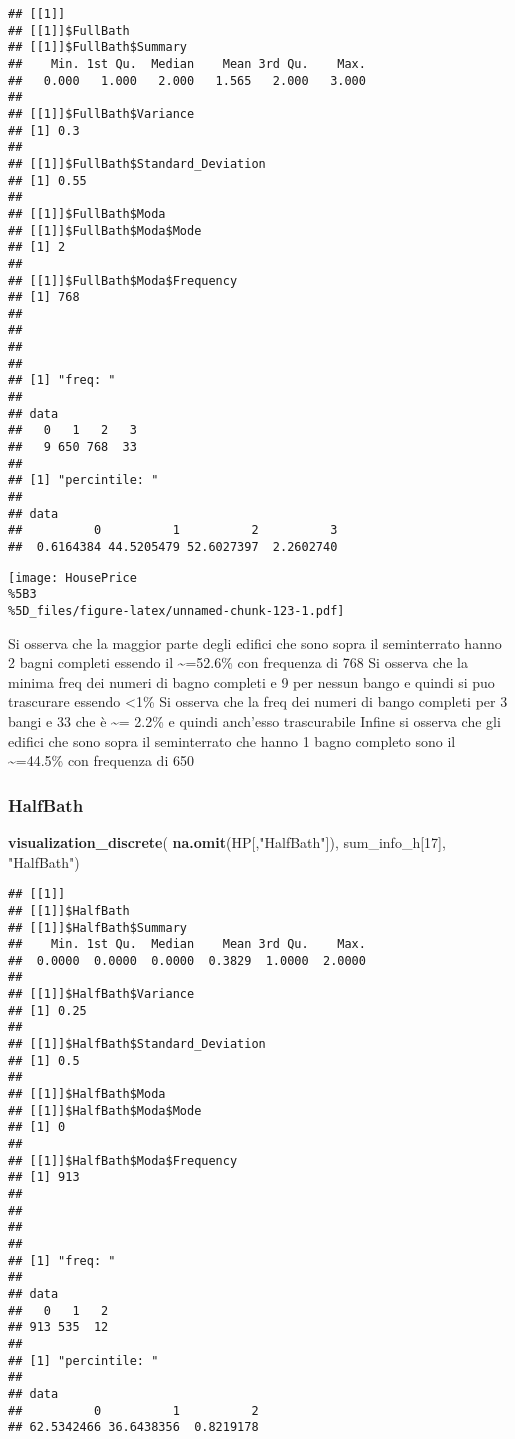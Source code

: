 \documentclass[
]{article}
\newenvironment{Shaded}{\begin{snugshade}}{\end{snugshade}}
\newcommand{\DecValTok}[1]{\textcolor[rgb]{0.00,0.00,0.81}{#1}}
\newcommand{\FunctionTok}[1]{\textcolor[rgb]{0.13,0.29,0.53}{\textbf{#1}}}
\newcommand{\NormalTok}[1]{#1}
\newcommand{\StringTok}[1]{\textcolor[rgb]{0.31,0.60,0.02}{#1}}
\begin{document}
\begin{verbatim}
## [[1]]
## [[1]]$FullBath
## [[1]]$FullBath$Summary
##    Min. 1st Qu.  Median    Mean 3rd Qu.    Max. 
##   0.000   1.000   2.000   1.565   2.000   3.000 
## 
## [[1]]$FullBath$Variance
## [1] 0.3
## 
## [[1]]$FullBath$Standard_Deviation
## [1] 0.55
## 
## [[1]]$FullBath$Moda
## [[1]]$FullBath$Moda$Mode
## [1] 2
## 
## [[1]]$FullBath$Moda$Frequency
## [1] 768
## 
## 
## 
## 
## [1] "freq: "
## 
## data
##   0   1   2   3 
##   9 650 768  33 
## 
## [1] "percintile: "
## 
## data
##          0          1          2          3 
##  0.6164384 44.5205479 52.6027397  2.2602740
\end{verbatim}

\texttt{[image: HousePrice\\\%5B3\\\%5D\_files/figure-latex/unnamed-chunk-123-1.pdf]}

Si osserva che la maggior parte degli edifici che sono sopra il
seminterrato hanno 2 bagni completi essendo il \textasciitilde=52.6\%
con frequenza di 768 Si osserva che la minima freq dei numeri di bagno
completi e 9 per nessun bango e quindi si puo trascurare essendo
\textless1\% Si osserva che la freq dei numeri di bango completi per 3
bangi e 33 che è \textasciitilde= 2.2\% e quindi anch'esso trascurabile
Infine si osserva che gli edifici che sono sopra il seminterrato che
hanno 1 bagno completo sono il \textasciitilde=44.5\% con frequenza di
650

\subsubsection{HalfBath}\label{halfbath}

\begin{Shaded}
\begin{Highlighting}[]
\FunctionTok{visualization\_discrete}\NormalTok{(}
  \FunctionTok{na.omit}\NormalTok{(HP[,}\StringTok{"HalfBath"}\NormalTok{]),}
\NormalTok{  sum\_info\_h[}\DecValTok{17}\NormalTok{],}
  \StringTok{"HalfBath"}\NormalTok{)}
\end{Highlighting}
\end{Shaded}

\begin{verbatim}
## [[1]]
## [[1]]$HalfBath
## [[1]]$HalfBath$Summary
##    Min. 1st Qu.  Median    Mean 3rd Qu.    Max. 
##  0.0000  0.0000  0.0000  0.3829  1.0000  2.0000 
## 
## [[1]]$HalfBath$Variance
## [1] 0.25
## 
## [[1]]$HalfBath$Standard_Deviation
## [1] 0.5
## 
## [[1]]$HalfBath$Moda
## [[1]]$HalfBath$Moda$Mode
## [1] 0
## 
## [[1]]$HalfBath$Moda$Frequency
## [1] 913
## 
## 
## 
## 
## [1] "freq: "
## 
## data
##   0   1   2 
## 913 535  12 
## 
## [1] "percintile: "
## 
## data
##          0          1          2 
## 62.5342466 36.6438356  0.8219178
\end{verbatim}
\end{document}
